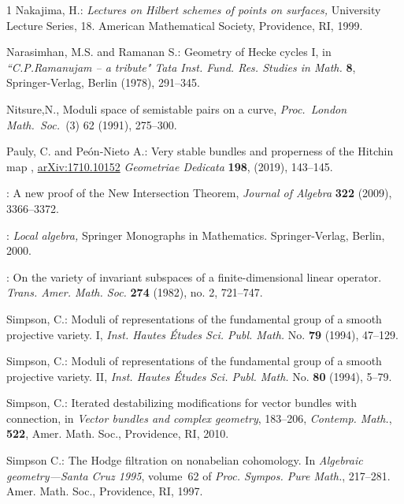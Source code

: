 \documentclass[12pt]{article}
\numberwithin{equation}{section}
\theoremstyle{remark}
\theoremstyle{definition}
\numberwithin{theorem}{section}
\renewcommand{\1}{\mathbbm{1}}
\begin{document}
\begin{thebibliography}{1}
 {\sc Nakajima, H.}: {\em Lectures on
	Hilbert schemes of points on surfaces,} University Lecture Series, 18. American Mathematical Society, Providence, RI,  1999.

{\sc Narasimhan, M.S. {\rm and} Ramanan S.}:
{ Geometry of Hecke cycles I}, in {\em ``C.P.Ramanujam -- a tribute" Tata Inst. Fund.
Res. Studies in Math.} {\bf 8}, Springer-Verlag, Berlin (1978),  291--345.

{\sc  Nitsure,N.},
Moduli space of semistable pairs on a curve,
{\it Proc.\ London Math.\ Soc.\ }(3) 62 (1991), 275--300.


 {\sc Pauly, C. {\rm and} Pe\'on-Nieto A.}: Very stable bundles and properness of the Hitchin map , \href{https://arxiv.org/abs/1710.10152v1}{arXiv:1710.10152} {\em Geometriae Dedicata} {\bf 198}, (2019), 143--145.

: A new proof of the New Intersection Theorem, {\em Journal of Algebra} {\bf 322 }(2009), 3366--3372.

:
{\em Local algebra,}  Springer Monographs in Mathematics. Springer-Verlag, Berlin, 2000.

:
On the variety of invariant subspaces of a finite-dimensional linear operator.
{\em Trans. Amer. Math. Soc.} {\bf 274 }(1982), no. 2, 721--747.

 {\sc Simpson, C.}:
Moduli of representations of the fundamental group of a smooth projective variety. I,
{\em Inst. Hautes \'Etudes Sci. Publ. Math.} No. {\bf 79} (1994), 47--129.

 {\sc Simpson, C.}:
Moduli of representations of the fundamental group of a smooth projective variety. II,
{\em Inst. Hautes \'Etudes Sci. Publ. Math.} No. {\bf 80} (1994), 5--79.

 {\sc Simpson, C.}:
Iterated destabilizing modifications for vector bundles with connection,  in {\em  Vector bundles and complex geometry}, 183--206,
{\em Contemp. Math.}, {\bf 522}, Amer. Math. Soc., Providence, RI, 2010.

{\sc Simpson C.}:
\newblock The {H}odge filtration on nonabelian cohomology.
\newblock In {\em Algebraic geometry---Santa Cruz 1995}, volume~62 of {\em
	Proc. Sympos. Pure Math.},  217--281. Amer. Math. Soc., Providence, RI,
1997.


\end{thebibliography}
\end{document}
